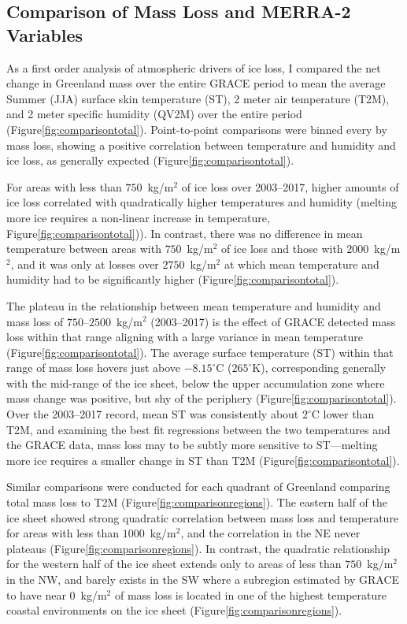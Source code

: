 \documentclass[11pt]{report}
\begin{document}
\clearpage
\subsection{Comparison of Mass Loss and MERRA-2 Variables}		

As a first order analysis of atmospheric drivers of ice loss, I compared the net change in Greenland mass over the entire GRACE period to mean the average Summer (JJA) surface skin temperature (ST), 2 meter air temperature (T2M), and 2 meter specific humidity (QV2M) over the entire period (Figure\ref{fig:comparisontotal}). Point-to-point comparisons were binned every by mass loss, showing a positive correlation between temperature and humidity and ice loss, as generally expected (Figure\ref{fig:comparisontotal}). 

For areas with less than $750$~kg/m$^2$ of ice loss over 2003--2017, higher amounts of ice loss correlated with quadratically higher temperatures and humidity (melting more ice requires a non-linear increase in temperature, Figure\ref{fig:comparisontotal})). In contrast, there was no difference in mean temperature between areas with $750$~kg/m$^2$ of ice loss and those with $2000$~kg/m$^2$, and it was only at losses over $2750$~kg/m$^2$ at which mean temperature and humidity had to be significantly higher (Figure\ref{fig:comparisontotal}). 

The plateau in the relationship between mean temperature and humidity and mass loss of $750$--$2500$~kg/m$^2$ (2003--2017) is the effect of GRACE detected mass loss within that range aligning with a large variance in mean temperature (Figure\ref{fig:comparisontotal}). The average surface temperature (ST) within that range of mass loss hovers just above $-8.15^{\circ}$C ($265^{\circ}$K), corresponding generally with the mid-range of the ice sheet, below the upper accumulation zone where mass change was positive, but shy of the periphery (Figure\ref{fig:comparisontotal}). Over the 2003--2017 record, mean ST was consistently about $2^{\circ}$C lower than T2M, and examining the best fit regressions between the two temperatures and the GRACE data, mass loss may to be subtly more sensitive to ST---melting more ice requires a smaller change in ST than T2M (Figure\ref{fig:comparisontotal}).

Similar comparisons were conducted for each quadrant of Greenland comparing total mass loss to T2M (Figure\ref{fig:comparisonregions}). The eastern half of the ice sheet showed strong quadratic correlation between mass loss and temperature for areas with less than $1000$~kg/m$^2$, and the correlation in the NE never plateaus (Figure\ref{fig:comparisonregions}). In contrast, the quadratic relationship for the western half of the ice sheet extends only to areas of less than $750$~kg/m$^2$ in the NW, and barely exists in the SW where a subregion estimated by GRACE to have near $0$~kg/m$^2$ of mass loss is located in one of the highest temperature coastal environments on the ice sheet (Figure\ref{fig:comparisonregions}). 
\end{document}
